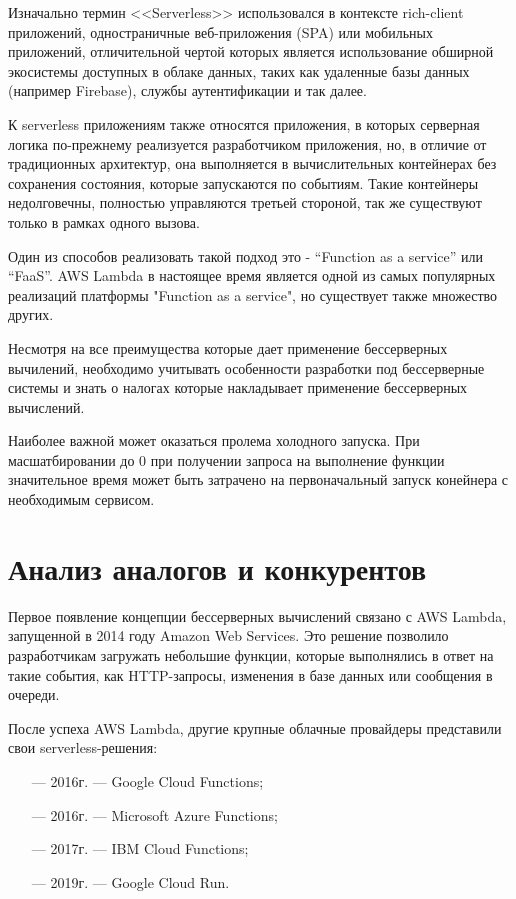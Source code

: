 Изначально термин <<Serverless>> использовался в контексте rich-client\cite{lowber2001thin} приложений,  одностраничные веб-приложения (SPA)\cite{kokkonen2015single} или мобильных приложений, отличительной чертой которых является использование обширной экосистемы доступных в облаке данных, таких как удаленные базы данных (например Firebase), службы аутентификации и так далее. 

К serverless приложениям также относятся приложения, в которых серверная логика по-прежнему реализуется разработчиком приложения, но, в отличие от традиционных архитектур, она выполняется в вычислительных контейнерах без сохранения состояния, которые запускаются по событиям. Такие контейнеры недолговечны, полностью управляются третьей стороной, так же существуют только в рамках одного вызова.

Один из способов реализовать такой подход это - “Function as a service” или “FaaS”. AWS Lambda в настоящее время является одной из самых популярных реализаций платформы "Function as a service", но существует также множество других.

Несмотря на все преимущества которые дает применение бессерверных вычилений, необходимо учитывать особенности разработки под бессерверные системы и знать о налогах которые накладывает применение бессерверных вычислений.

Наиболее важной может оказаться пролема холодного запуска\cite{liu2023faaslight}. При масшатбировании до 0 при получении запроса на выполнение функции значительное время может быть затрачено на первоначальный запуск конейнера с необходимым сервисом\cite{silva2020prebaking}. 

\section{Анализ аналогов и конкурентов}

Первое появление концепции бессерверных вычислений связано с AWS Lambda, запущенной в 2014 году Amazon Web Services. Это решение позволило разработчикам загружать небольшие функции, которые выполнялись в ответ на такие события, как HTTP-запросы, изменения в базе данных или сообщения в очереди.

После успеха AWS Lambda, другие крупные облачные провайдеры представили свои serverless-решения:
\begin{itemize}
    \item[---] 2016г. — Google Cloud Functions;
    \item[---] 2016г. — Microsoft Azure Functions;
    \item[---] 2017г. — IBM Cloud Functions;
    \item[---] 2019г. — Google Cloud Run.
\end{itemize}

